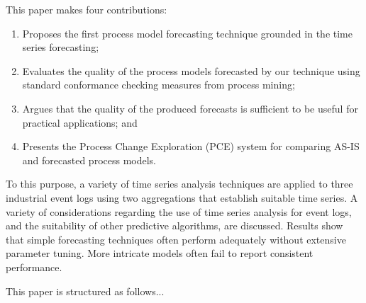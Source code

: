 This paper makes four contributions:
\begin{enumerate}
	\item Proposes the first process model forecasting technique grounded in the time series forecasting;
	\item Evaluates the quality of the process models forecasted by our technique using standard conformance checking measures from process mining;
	\item Argues that the quality of the produced forecasts is sufficient to be useful for practical applications; and
	\item Presents the Process Change Exploration (PCE) system for comparing AS-IS and forecasted process models.
\end{enumerate}

To this purpose, a variety of time series analysis techniques are applied to three industrial event logs using two aggregations that establish suitable time series. 
A variety of considerations regarding the use of time series analysis for event logs, and the suitability of other predictive algorithms, are discussed.
Results show that simple forecasting techniques often perform adequately without extensive parameter tuning. 
More intricate models often fail to report consistent performance.

This paper is structured as follows...
